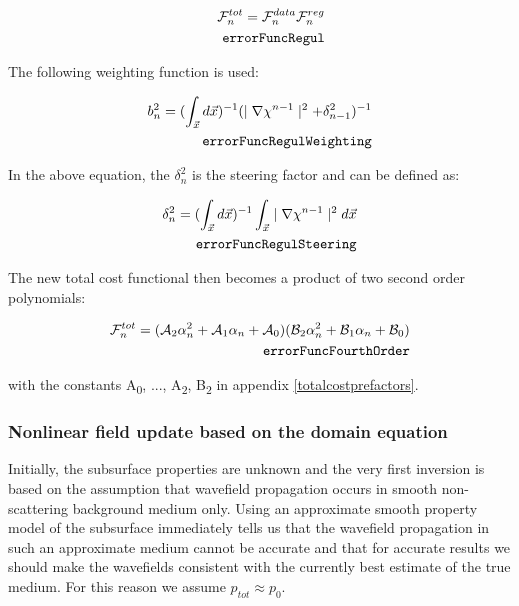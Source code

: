 \documentclass[10pt,a4paper]{article}
\begin{document}
\begin{align} \label{eq:errorFuncRegul} \mathcal{F}^{tot}_n =
\mathcal{F}^{data}_n \mathcal{F}^{reg}_n\\
\tag*{\texttt{errorFuncRegul}}
\end{align}

The following weighting function is used:

\begin{align} \label{eq:errorFuncRegulWeighting} b_n^{2} = (\int_{\vec{x}}
d\vec{x})^{-1} (\mid\nabla\chi^{n-1}\mid^2 + \delta_{n-1}^2)^{-1}\\
\tag*{\texttt{errorFuncRegulWeighting}}
\end{align}

In the above equation, the $\delta_{n}^2$ is the steering factor and
can be defined as:

\begin{align} \label{eq:errorFuncRegulSteering} \delta_{n}^2 = (\int_{\vec{x}}
d\vec{x})^{-1} \int_{\vec{x}} \mid\nabla\chi^{n-1}\mid^2 d\vec{x}\\
\tag*{\texttt{errorFuncRegulSteering}}
\end{align}

The new total cost functional then becomes a
product of two second order
polynomials:

\begin{align} \label{eq:errorFuncFourthOrder} \mathcal{F}^{tot}_n =
(\mathcal{A}_2\alpha^{2}_n + \mathcal{A}_1\alpha_n
+\mathcal{A}_0)(\mathcal{B}_2\alpha^{2}_n + \mathcal{B}_1\alpha_n +
\mathcal{B}_0)\\
\tag*{\texttt{errorFuncFourthOrder}}
\end{align}

with the constants A\textsubscript{0}, ...,
A\textsubscript{2}, B\textsubscript{2} in appendix
\ref{totalcostprefactors}.

\subsubsection{Nonlinear field update based on the domain equation}
\label{nonlinfupdate}
Initially, the subsurface properties are unknown  and the very first
inversion is based on the assumption that wavefield propagation occurs
in smooth non-scattering background medium only.
Using an approximate smooth property model of the subsurface
immediately tells us that the wavefield propagation in such an
approximate medium cannot be accurate and that for accurate
results we should make the wavefields consistent with the currently
best estimate of the true medium. For this reason we assume $p_{tot}
\approx p_0$.
\end{document}
